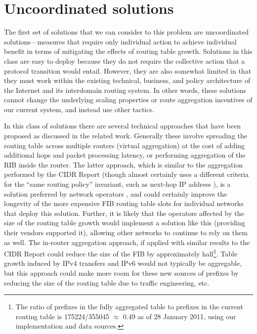 \section{Uncoordinated solutions}
The first set of solutions that we can consider to this problem are
uncoordinated solutions---measures that require only individual action to
achieve individual benefit in terms of mitigating the effects of routing table
growth. Solutions in this class are easy to deploy because they do not require
the collective action that a protocol transition would entail. However, they
are also somewhat limited in that they must work within the existing technical,
business, and policy architecture of the Internet and its interdomain routing
system. In other words, these solutions cannot change the underlying scaling
properties or route aggregation incentives of our current system, and instead
use other tactics.

In this class of solutions there are several technical approaches that have
been proposed as discussed in the related work. Generally these involve
spreading the routing table across multiple routers (virtual aggregation)
\cite{Ballani:2009tg} at the cost of adding additional hops and packet
processing latency, or performing aggregation of the RIB inside the router. The
latter approach, which is similar to the aggregation performed by the CIDR
Report (though almost certainly uses a different criteria for the ``same
routing policy'' invariant, such as next-hop IP address
), is a solution preferred by network operators \cite{Zhao:2010fu}, and could
certainly improve the longevity of the more expensive FIB routing table slots
for individual networks that deploy this solution. Further, it is likely that
the operators affected by the size of the routing table growth would implement
a solution like this (providing their vendors supported it), allowing other
networks to continue to rely on them as well. The in-router aggregation
approach, if applied with similar results to the CIDR Report could reduce the
size of the FIB by approximately half\footnote{The ratio of prefixes in the
fully aggregated table to prefixes in the current routing table is
175224/355045 $\approx$ 0.49 as of 28 January 2011, using our implementation
and data sources.}. Table growth induced by IPv4 transfers and IPv6 would not
typically be aggregable, but this approach could make more room for these new
sources of prefixes by reducing the size of the routing table due to traffic
engineering, etc.

